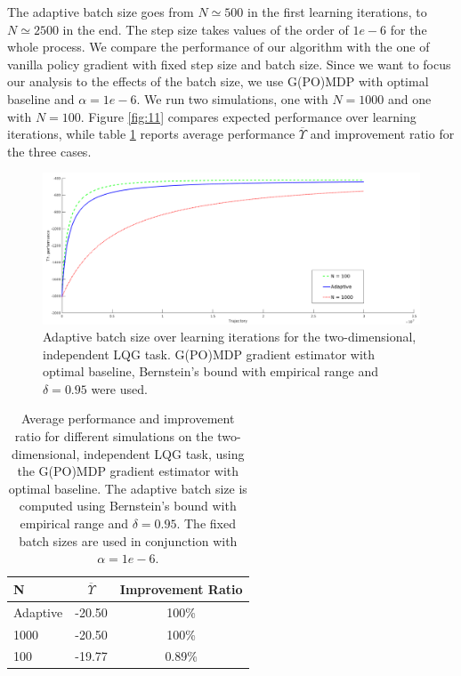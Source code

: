 The adaptive batch size goes from $N \simeq 500$ in the first learning iterations, to $N\simeq2500$ in the end. The step size takes values of the order of $1e-6$ for the whole process.
We compare the performance of our algorithm with the one of vanilla policy gradient with fixed step size and batch size. Since we want to focus our analysis to the effects of the batch size, we use G(PO)MDP with optimal baseline and $\alpha=1e-6$. We run two simulations, one with $N=1000$ and one with $N=100$. Figure \ref{fig:11} compares expected performance over learning iterations, while table \ref{tab:3} reports average performance $\overline{\Upsilon}$ and improvement ratio for the three cases.

\begin{figure}[h!]\label{fig:11}
\includegraphics[width = 1.4\textwidth,left]{Images/lqg2d.png}
\caption{Adaptive batch size over learning iterations for the two-dimensional, independent \ac{LQG} task. G(PO)MDP gradient estimator with optimal baseline, Bernstein's bound with empirical range and $\delta=0.95$ were used.}
\label{fig:9}
\end{figure}

\begin{table}[h!]\label{tab:3}
\caption{Average performance and improvement ratio for different simulations on the two-dimensional, independent \ac{LQG} task, using the G(PO)MDP gradient estimator with optimal baseline. The adaptive batch size is computed using Bernstein's bound with empirical range and $\delta=0.95$. The fixed batch sizes are used in conjunction with $\alpha=1e-6$.}
\centering
\begin{adjustbox}{center}
\begin{tabular}{@{}lcc@{}} 
\toprule
N & $\overline{\Upsilon}$ & Improvement Ratio \\
\midrule
Adaptive & -20.50 & 100\% \\
1000 & -20.50 & 100\% \\
100 & -19.77 & 0.89\% \\
\bottomrule
\end{tabular}
\end{adjustbox}
\end{table}


